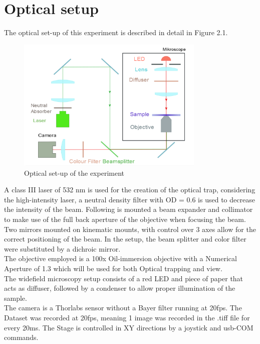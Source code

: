 \documentclass[a4paper,english,12pt,bibliography=totoc]{scrreprt}
\begin{document}
\section{Optical setup}
The optical set-up of this experiment is described in detail in Figure 2.1.\\
\begin{figure}[H]
    \centering
    \includegraphics[width = 0.8\textwidth]{Images/experiment setup.png}
    \caption{Optical set-up of the experiment\cite{lab_manual}}
    \label{fig:enter-label}
\end{figure}
A  class III laser of 532 nm is used for the creation of the optical trap, considering the high-intensity laser, a neutral density filter with OD = 0.6 is used to decrease the intensity of the beam. Following is mounted a beam expander and collimator to make use of the full back aperture of the objective when focusing the beam. Two mirrors mounted on kinematic mounts, with control over 3 axes allow for the correct positioning of the beam. In the setup, the beam splitter and color filter were substituted by a dichroic mirror.\\

The objective employed is a 100x Oil-immersion objective with a Numerical Aperture of 1.3 which will be used for both Optical trapping and view.\\

The widefield microscopy setup consists of a red LED and piece of paper that acts as diffuser, followed by a condenser to allow proper illumination of the sample.\\

The camera is a Thorlabs sensor without a Bayer filter running at 20fps.
The Dataset was recorded at 20fps, meaning 1 image was recorded in the .tiff file for every 20ms.
The Stage is controlled in XY directions by a joystick and usb-COM commands.
\end{document}
